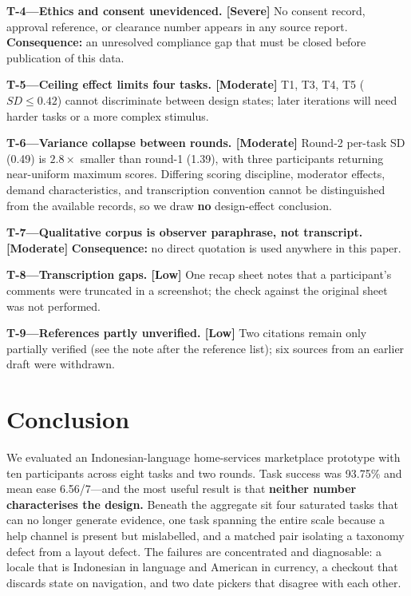 \documentclass[conference]{IEEEtran}
\begin{document}
\medskip\noindent\textbf{T-4---Ethics and consent unevidenced. [Severe]}
No consent record, approval reference, or clearance number appears in any
source report. \textbf{Consequence:} an unresolved compliance gap that
must be closed before publication of this data.

\medskip\noindent\textbf{T-5---Ceiling effect limits four tasks.
[Moderate]} T1, T3, T4, T5 ($SD\leq0.42$) cannot discriminate between
design states; later iterations will need harder tasks or a more complex
stimulus.

\medskip\noindent\textbf{T-6---Variance collapse between rounds.
[Moderate]} Round-2 per-task SD (0.49) is $2.8\times$ smaller than
round-1 (1.39), with three participants returning near-uniform maximum
scores. Differing scoring discipline, moderator effects, demand
characteristics, and transcription convention cannot be distinguished from
the available records, so we draw \textbf{no} design-effect conclusion.

\medskip\noindent\textbf{T-7---Qualitative corpus is observer paraphrase,
not transcript. [Moderate]} \textbf{Consequence:} no direct quotation is
used anywhere in this paper.

\medskip\noindent\textbf{T-8---Transcription gaps. [Low]} One recap sheet
notes that a participant's comments were truncated in a screenshot; the
check against the original sheet was not performed.

\medskip\noindent\textbf{T-9---References partly unverified. [Low]} Two
citations remain only partially verified (see the note after the reference
list); six sources from an earlier draft were withdrawn.

\section{Conclusion}

We evaluated an Indonesian-language home-services marketplace prototype
with ten participants across eight tasks and two rounds. Task success was
93.75\% and mean ease 6.56/7---and the most useful result is that
\textbf{neither number characterises the design.} Beneath the aggregate sit
four saturated tasks that can no longer generate evidence, one task
spanning the entire scale because a help channel is present but
mislabelled, and a matched pair isolating a taxonomy defect from a layout
defect. The failures are concentrated and diagnosable: a locale that is
Indonesian in language and American in currency, a checkout that discards
state on navigation, and two date pickers that disagree with each other.
\end{document}
